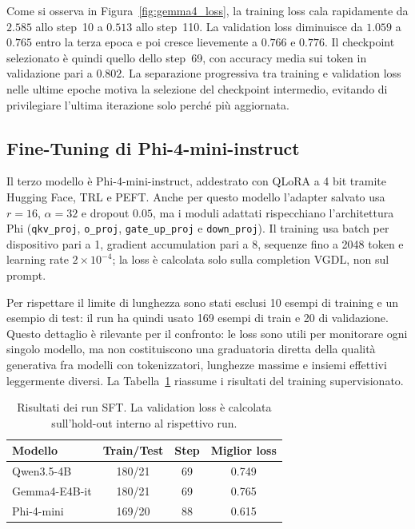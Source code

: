 \documentclass[final,5p,times,twocolumn]{elsarticle}
\begin{document}
Come si osserva in Figura~\ref{fig:gemma4_loss}, la training loss cala rapidamente da $2.585$ allo step~10 a $0.513$ allo step~110. La validation loss diminuisce da $1.059$ a $0.765$ entro la terza epoca e poi cresce lievemente a $0.766$ e $0.776$. Il checkpoint selezionato è quindi quello dello step~69, con accuracy media sui token in validazione pari a $0.802$. La separazione progressiva tra training e validation loss nelle ultime epoche motiva la selezione del checkpoint intermedio, evitando di privilegiare l'ultima iterazione solo perché più aggiornata.

\subsection{Fine-Tuning di Phi-4-mini-instruct}

Il terzo modello è Phi-4-mini-instruct, addestrato con QLoRA a 4 bit tramite Hugging Face, TRL e PEFT. Anche per questo modello l'adapter salvato usa $r=16$, $\alpha=32$ e dropout $0.05$, ma i moduli adattati rispecchiano l'architettura Phi (\texttt{qkv\_proj}, \texttt{o\_proj}, \texttt{gate\_up\_proj} e \texttt{down\_proj}). Il training usa batch per dispositivo pari a 1, gradient accumulation pari a 8, sequenze fino a 2048 token e learning rate $2 \times 10^{-4}$; la loss è calcolata solo sulla completion VGDL, non sul prompt.

Per rispettare il limite di lunghezza sono stati esclusi 10 esempi di training e un esempio di test: il run ha quindi usato 169 esempi di train e 20 di validazione. Questo dettaglio è rilevante per il confronto: le loss sono utili per monitorare ogni singolo modello, ma non costituiscono una graduatoria diretta della qualità generativa fra modelli con tokenizzatori, lunghezze massime e insiemi effettivi leggermente diversi. La Tabella~\ref{tab:sft-training} riassume i risultati del training supervisionato.

\begin{table}[t]
  \centering
  \small
  \caption{Risultati dei run SFT. La validation loss è calcolata sull'hold-out interno al rispettivo run.}
  \label{tab:sft-training}
  \begin{tabular}{lccc}
    \toprule
    Modello & Train/Test & Step & Miglior loss \\
    \midrule
    Qwen3.5-4B & 180/21 & 69 & 0.749 \\
    Gemma4-E4B-it & 180/21 & 69 & 0.765 \\
    Phi-4-mini & 169/20 & 88 & 0.615 \\
    \bottomrule
  \end{tabular}
\end{table}
\end{document}
